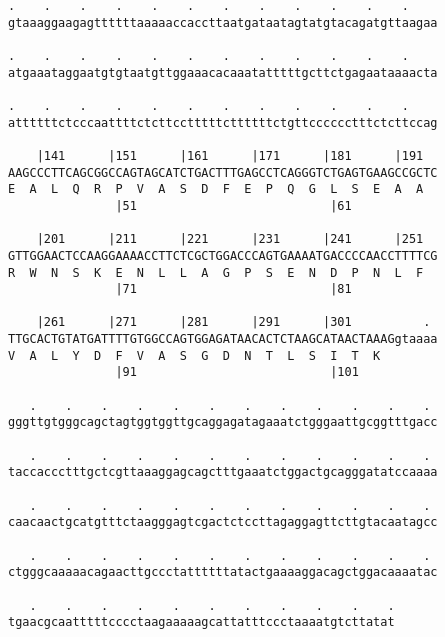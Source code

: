 \documentclass{article}
\begin{document}
\begin{Verbatim}
.    .    .    .    .    .    .    .    .    .    .    .    
gtaaaggaagagttttttaaaaaccaccttaatgataatagtatgtacagatgttaagaa
                                                            
.    .    .    .    .    .    .    .    .    .    .    .    
atgaaataggaatgtgtaatgttggaaacacaaatatttttgcttctgagaataaaacta
                                                            
.    .    .    .    .    .    .    .    .    .    .    .    
attttttctcccaattttctcttcctttttcttttttctgttcccccctttctcttccag
                                                            
    |141      |151      |161      |171      |181      |191  
AAGCCCTTCAGCGGCCAGTAGCATCTGACTTTGAGCCTCAGGGTCTGAGTGAAGCCGCTC
E  A  L  Q  R  P  V  A  S  D  F  E  P  Q  G  L  S  E  A  A  
               |51                           |61            
  
    |201      |211      |221      |231      |241      |251  
GTTGGAACTCCAAGGAAAACCTTCTCGCTGGACCCAGTGAAAATGACCCCAACCTTTTCG
R  W  N  S  K  E  N  L  L  A  G  P  S  E  N  D  P  N  L  F  
               |71                           |81            
  
    |261      |271      |281      |291      |301          . 
TTGCACTGTATGATTTTGTGGCCAGTGGAGATAACACTCTAAGCATAACTAAAGgtaaaa
V  A  L  Y  D  F  V  A  S  G  D  N  T  L  S  I  T  K        
               |91                           |101           
  
   .    .    .    .    .    .    .    .    .    .    .    . 
gggttgtgggcagctagtggtggttgcaggagatagaaatctgggaattgcggtttgacc
                                                            
   .    .    .    .    .    .    .    .    .    .    .    . 
taccaccctttgctcgttaaaggagcagctttgaaatctggactgcagggatatccaaaa
                                                            
   .    .    .    .    .    .    .    .    .    .    .    . 
caacaactgcatgtttctaagggagtcgactctccttagaggagttcttgtacaatagcc
                                                            
   .    .    .    .    .    .    .    .    .    .    .    . 
ctgggcaaaaacagaacttgccctattttttatactgaaaaggacagctggacaaaatac
                                                            
   .    .    .    .    .    .    .    .    .    .    .
tgaacgcaatttttcccctaagaaaaagcattatttccctaaaatgtcttatat
                                                      

\end{Verbatim}
\end{document}
